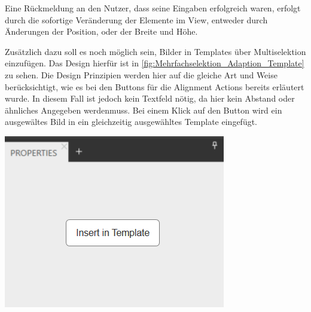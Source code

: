 Eine Rückmeldung an den Nutzer, dass seine Eingaben erfolgreich waren, erfolgt durch die sofortige Veränderung der Elemente im View, entweder durch Änderungen der Position, oder der Breite und Höhe.

Zusätzlich dazu soll es noch möglich sein, Bilder in Templates über Multiselektion einzufügen.
Das Design hierfür ist in \cref{fig:Mehrfachselektion_Adaption_Template} zu sehen.
Die Design Prinzipien werden hier auf die gleiche Art und Weise berücksichtigt, wie es bei den Buttons für die Alignment Actions bereits erläutert wurde.
In diesem Fall ist jedoch kein Textfeld nötig, da hier kein Abstand oder ähnliches Angegeben werdenmuss.
Bei einem Klick auf den Button wird ein ausgewältes Bild in ein gleichzeitig ausgewähltes Template eingefügt.

\begin{center}
  \includegraphics[scale=0.8]{figures/Mehrfachselektion_Adaption03.png}
  \label{fig:Mehrfachselektion_Adaption_Template}
\end{center}



